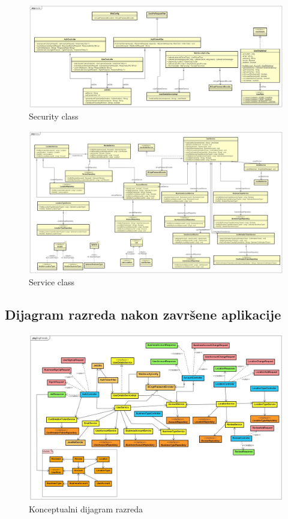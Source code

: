         \begin{figure}[H]
        	\includegraphics[width=\textwidth]{img/Dijagrami razreda/Security_Class_Dijagram.jpg}
        	\centering
        	\caption{Security class}
        	\label{fig:promjene}
        \end{figure}
        \begin{figure}[H]
        	\includegraphics[width=\textwidth]{img/Dijagrami razreda/Service_Class_Dijagram.jpg}
        	\centering
        	\caption{Service class}
        	\label{fig:promjene}
        \end{figure}

        \eject
        \subsection{Dijagram razreda nakon završene aplikacije}
        \begin{figure}[H]
        	\includegraphics[width=\textwidth]{img/Dijagrami razreda/Class_Diagram.jpg}
        	\centering
        	\caption{Konceptualni dijagram razreda}
        	\label{fig:promjene}
        \end{figure}
    

